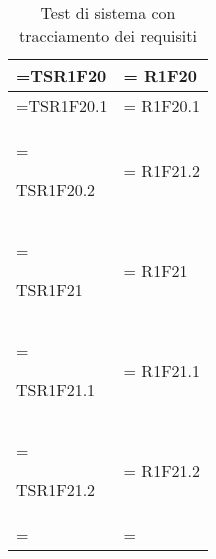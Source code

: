 \begin{xltabular}{\textwidth} {
            >{\hsize\linewidth=\hsize}X
            >{\hsize\linewidth=\hsize}X
        }
        TSR1F20 &
        R1F20
        \\ \hline

        TSR1F20.1 &
        R1F20.1
        \\ \hline

        TSR1F20.2 &
        R1F21.2 
        \\ \hline

        TSR1F21 &
        R1F21
        \\ \hline

        TSR1F21.1 &
        R1F21.1
        \\ \hline

        TSR1F21.2 &
        R1F21.2
        \\ \hline

        \caption{Test di sistema con tracciamento dei requisiti}
    \end{xltabular}

    \pagebreak